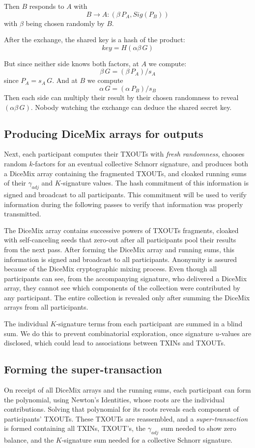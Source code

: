 \documentclass[8pt,fleqn,openany]{book}
\begin{document}
Then $B$ responds to $A$ with
$$B \rightarrow A: (\beta \, P_A, Sig(P_B))$$
with $\beta$ being chosen randomly by $B$. 

After the exchange, the shared key is a hash of the product:
$$key = H(\alpha \beta \, G)$$ 

But since neither side knows both factors, at $A$ we compute:
$$\beta \, G = (\beta \, P_A) / s_A$$
since $P_A = s_A \, G$. And at $B$ we compute
$$\alpha \, G = (\alpha \, P_B) / s_B$$
Then each side can multiply their result by their chosen randomness to reveal $(\alpha \beta \, G)$. Nobody watching the exchange can deduce the shared secret key.

\subsection{Producing DiceMix arrays for outputs} 
Next, each participant computes their TXOUTs with \textit{fresh randomness}, chooses random $k$-factors for an eventual collective Schnorr signature, and produces both a DiceMix array containing the fragmented TXOUTs, and cloaked running sums of their $\gamma_{adj}$ and $K$-signature values. The hash commitment of this information is signed and broadcast to all participants. This commitment will be used to verify information during the following passes to verify that information was properly transmitted.

The DiceMix array contains successive powers of TXOUTs fragments, cloaked with self-canceling seeds that zero-out after all participants pool their results from the next pass. After forming the DiceMix array and running sums, this information is signed and broadcast to all participants. Anonymity is assured because of the DiceMix cryptographic mixing process. Even though all participants can see, from the accompanying signature, who delivered a DiceMix array, they cannot see which components of the collection were contributed by any participant. The entire collection is revealed only after summing the DiceMix arrays from all participants.

The individual $K$-signature terms from each participant are summed in a blind sum. We do this to prevent combinatorial exploration, once signature $u$-values are disclosed, which could lead to associations between TXINs and TXOUTs.

\subsection{Forming the super-transaction} 
On receipt of all DiceMix arrays and the running sums, each participant can form the polynomial, using Newton’s Identities, whose roots are the individual contributions. Solving that polynomial for its roots reveals each component of participants’ TXOUTs. These TXOUTs are reassembled, and a \textit{super-transaction} is formed containing all TXINs, TXOUT’s, the $\gamma_{adj}$ sum needed to show zero balance, and the $K$-signature sum needed for a collective Schnorr signature.
\end{document}
